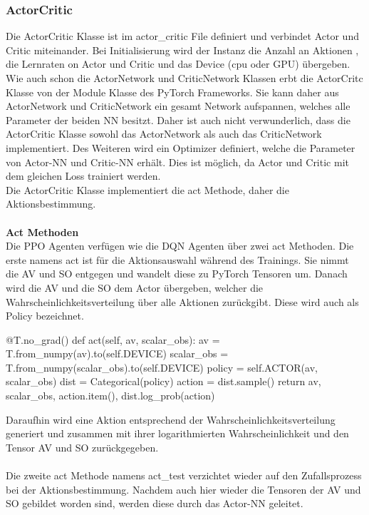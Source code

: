 \subsubsection{ActorCritic} \label{sec:Implementierung_ActorCritic}
Die ActorCritic Klasse ist im actor\_critic File definiert und verbindet Actor und Critic miteinander. Bei Initialisierung wird der Instanz die Anzahl an Aktionen , die Lernraten on Actor und Critic und das Device (cpu oder GPU) übergeben.\\
Wie auch schon die ActorNetwork und CriticNetwork Klassen erbt die ActorCritc Klasse von der Module Klasse des PyTorch Frameworks. Sie kann daher aus ActorNetwork und CriticNetwork ein gesamt Network aufspannen, welches alle Parameter der beiden NN besitzt. Daher ist auch nicht verwunderlich, dass die ActorCritic Klasse sowohl das ActorNetwork als auch das CriticNetwork implementiert. Des Weiteren wird ein Optimizer definiert, welche die Parameter von Actor-NN und Critic-NN erhält. Dies ist möglich, da Actor und Critic mit dem gleichen Loss trainiert werden.\\
Die ActorCritic Klasse implementiert die act Methode, daher die Aktionsbestimmung.\\
\\\textbf{Act Methoden}\\
Die PPO Agenten verfügen wie die DQN Agenten über zwei act Methoden. Die erste namens act ist für die Aktionsauswahl während des Trainings. Sie nimmt die AV und SO entgegen und wandelt diese zu PyTorch Tensoren um. Danach wird die AV und die SO dem Actor übergeben, welcher die Wahrscheinlichkeitsverteilung über alle Aktionen zurückgibt. Diese wird auch als Policy bezeichnet.
\begin{python}
	@T.no_grad()
	def act(self, av, scalar_obs):
		av = T.from_numpy(av).to(self.DEVICE)
		scalar_obs = T.from_numpy(scalar_obs).to(self.DEVICE)
		policy = self.ACTOR(av, scalar_obs)
		dist = Categorical(policy)
		action = dist.sample()
		return av, scalar_obs, action.item(), dist.log_prob(action)
\end{python}
Daraufhin wird eine Aktion entsprechend der Wahrscheinlichkeitsverteilung generiert und zusammen mit ihrer logarithmierten Wahrscheinlichkeit und den Tensor AV und SO zurückgegeben.\\
\\Die zweite act Methode namens act\_test verzichtet wieder auf den Zufallsprozess bei der Aktionsbestimmung. Nachdem auch hier wieder die Tensoren der AV und SO gebildet worden sind, werden diese durch das Actor-NN geleitet.
